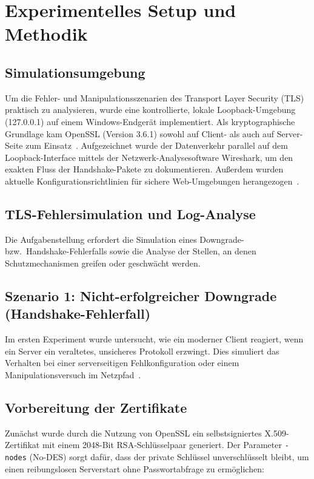 \section{Experimentelles Setup und Methodik}

\subsection{Simulationsumgebung}

Um die Fehler- und Manipulationsszenarien des Transport Layer Security (TLS) praktisch zu analysieren, wurde eine kontrollierte, lokale Loopback-Umgebung (127.0.0.1) auf einem Windows-Endgerät implementiert. Als kryptographische Grundlage kam OpenSSL (Version 3.6.1) sowohl auf Client- als auch auf Server-Seite zum Einsatz~\cite{openssl}. Aufgezeichnet wurde der Datenverkehr parallel auf dem Loopback-Interface mittels der Netzwerk-Analysesoftware Wireshark, um den exakten Fluss der Handshake-Pakete zu dokumentieren. Außerdem wurden aktuelle Konfigurationsrichtlinien für sichere Web-Umgebungen herangezogen~\cite{mdndocs}.


\subsection{TLS-Fehlersimulation und Log-Analyse}
Die Aufgabenstellung erfordert die Simulation eines Downgrade- bzw.\ Handshake-Fehlerfalls sowie die Analyse der Stellen, an denen Schutzmechanismen greifen oder geschwächt werden.


\subsection{Szenario 1: Nicht-erfolgreicher Downgrade (Handshake-Fehlerfall)}
Im ersten Experiment wurde untersucht, wie ein moderner Client reagiert, wenn ein Server ein veraltetes, unsicheres Protokoll erzwingt. Dies simuliert das Verhalten bei einer serverseitigen Fehlkonfiguration oder einem Manipulationsversuch im Netzpfad~\cite{sentinelone}.

\subsection*{Vorbereitung der Zertifikate}
Zunächst wurde durch die Nutzung von OpenSSL ein selbstsigniertes X.509-Zertifikat mit einem 2048-Bit RSA-Schlüsselpaar generiert. Der Parameter \texttt{-nodes} (No-DES) sorgt dafür, dass der private Schlüssel unverschlüsselt bleibt, um einen reibungslosen Serverstart ohne Passwortabfrage zu ermöglichen:

